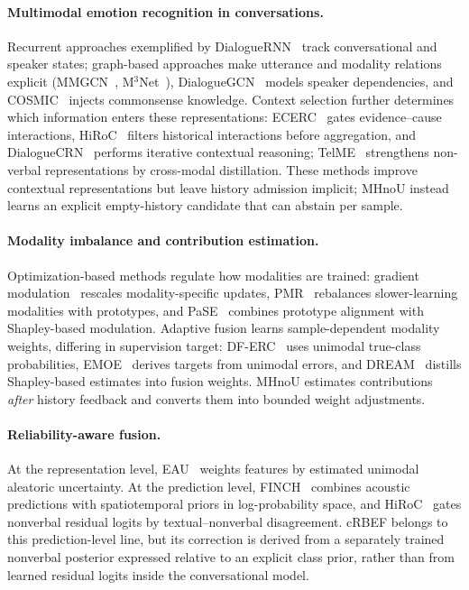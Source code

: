 \documentclass[10pt,twocolumn,letterpaper]{article}
\begin{document}
\paragraph{Multimodal emotion recognition in conversations.}
Recurrent approaches exemplified by DialogueRNN~\cite{majumder2019dialoguernn} track conversational and speaker states; graph-based approaches make utterance and modality relations explicit (MMGCN~\cite{hu2021mmgcn}, M$^3$Net~\cite{chen2023m3net}), DialogueGCN~\cite{ghosal2019dialoguegcn} models speaker dependencies, and COSMIC~\cite{ghosal2020cosmic} injects commonsense knowledge.
Context selection further determines which information enters these representations: ECERC~\cite{zhang2025ecerc} gates evidence--cause interactions, HiRoC~\cite{li2026hiroc} filters historical interactions before aggregation, and DialogueCRN~\cite{hu2021dialoguecrn} performs iterative contextual reasoning; TelME~\cite{yun2024telme} strengthens non-verbal representations by cross-modal distillation.
These methods improve contextual representations but leave history admission implicit; MHnoU instead learns an explicit empty-history candidate that can abstain per sample.

\paragraph{Modality imbalance and contribution estimation.}
Optimization-based methods regulate how modalities are trained: gradient modulation~\cite{peng2022gradientmodulation} rescales modality-specific updates, PMR~\cite{fan2023pmr} rebalances slower-learning modalities with prototypes, and PaSE~\cite{he2026pase} combines prototype alignment with Shapley-based modulation.
Adaptive fusion learns sample-dependent modality weights, differing in supervision target: DF-ERC~\cite{li2023dferc} uses unimodal true-class probabilities, EMOE~\cite{fang2025emoe} derives targets from unimodal errors, and DREAM~\cite{bi2025dream} distills Shapley-based estimates into fusion weights.
MHnoU estimates contributions \emph{after} history feedback and converts them into bounded weight adjustments.

\paragraph{Reliability-aware fusion.}
At the representation level, EAU~\cite{gao2024eau} weights features by estimated unimodal aleatoric uncertainty.
At the prediction level, FINCH~\cite{ovanger2026finch} combines acoustic predictions with spatiotemporal priors in log-probability space, and HiRoC~\cite{li2026hiroc} gates nonverbal residual logits by textual--nonverbal disagreement.
cRBEF belongs to this prediction-level line, but its correction is derived from a separately trained nonverbal posterior expressed relative to an explicit class prior, rather than from learned residual logits inside the conversational model.
\end{document}
